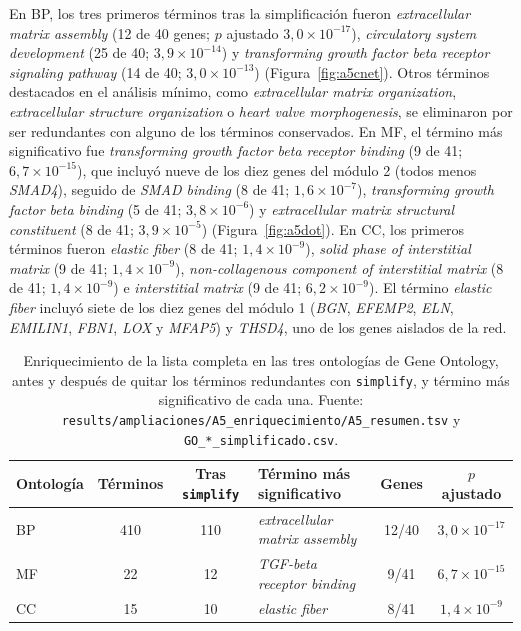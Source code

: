 En BP, los tres primeros términos tras la simplificación fueron \textit{extracellular matrix assembly} (12 de 40 genes; $p$ ajustado $3{,}0\times10^{-17}$), \textit{circulatory system development} (25 de 40; $3{,}9\times10^{-14}$) y \textit{transforming growth factor beta receptor signaling pathway} (14 de 40; $3{,}0\times10^{-13}$) (Figura~\ref{fig:a5cnet}). Otros términos destacados en el análisis mínimo, como \textit{extracellular matrix organization}, \textit{extracellular structure organization} o \textit{heart valve morphogenesis}, se eliminaron por ser redundantes con alguno de los términos conservados. En MF, el término más significativo fue \textit{transforming growth factor beta receptor binding} (9 de 41; $6{,}7\times10^{-15}$), que incluyó nueve de los diez genes del módulo 2 (todos menos \textit{SMAD4}), seguido de \textit{SMAD binding} (8 de 41; $1{,}6\times10^{-7}$), \textit{transforming growth factor beta binding} (5 de 41; $3{,}8\times10^{-6}$) y \textit{extracellular matrix structural constituent} (8 de 41; $3{,}9\times10^{-5}$) (Figura~\ref{fig:a5dot}). En CC, los primeros términos fueron \textit{elastic fiber} (8 de 41; $1{,}4\times10^{-9}$), \textit{solid phase of interstitial matrix} (9 de 41; $1{,}4\times10^{-9}$), \textit{non-collagenous component of interstitial matrix} (8 de 41; $1{,}4\times10^{-9}$) e \textit{interstitial matrix} (9 de 41; $6{,}2\times10^{-9}$). El término \textit{elastic fiber} incluyó siete de los diez genes del módulo 1 (\textit{BGN}, \textit{EFEMP2}, \textit{ELN}, \textit{EMILIN1}, \textit{FBN1}, \textit{LOX} y \textit{MFAP5}) y \textit{THSD4}, uno de los genes aislados de la red.

\begin{table}[h!]
	\footnotesize
	\setlength{\tabcolsep}{4pt}
	\renewcommand{\arraystretch}{1.25}
	\caption{Enriquecimiento de la lista completa en las tres ontologías de Gene Ontology, antes y después de quitar los términos redundantes con \texttt{simplify}, y término más significativo de cada una. Fuente: \texttt{results/ampliaciones/A5\_enriquecimiento/A5\_resumen.tsv} y \texttt{GO\_*\_simplificado.csv}.}
	\label{tab:a5}
	\begin{tabular}{lcclcc}
		\hline
		Ontología & Términos & Tras \texttt{simplify} & Término más significativo & Genes & $p$ ajustado \tabularnewline
		\hline
		BP & 410 & 110 & \textit{extracellular matrix assembly} & 12/40 & $3{,}0\times10^{-17}$ \tabularnewline
		MF & 22 & 12 & \textit{TGF-beta receptor binding} & 9/41 & $6{,}7\times10^{-15}$ \tabularnewline
		CC & 15 & 10 & \textit{elastic fiber} & 8/41 & $1{,}4\times10^{-9}$ \tabularnewline
		\hline
	\end{tabular}
\end{table}

